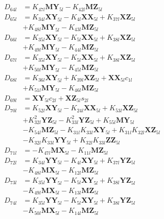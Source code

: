 \begin{align}
 \nonumber \\ 
D_{64l} &= K_{47l}\mathbf{MY}_{5l} - K_{42l}\mathbf{MZ}_{5l} \nonumber \\
D_{65l} &= K_{34l}\mathbf{XY}_{5l} - K_{4l}\mathbf{XX}_{5l} + K_{37l}\mathbf{XZ}_{5l}  \nonumber \\
&+ K_{48l}\mathbf{MY}_{5l} - K_{43l}\mathbf{MZ}_{5l} \nonumber \\
D_{66l} &= K_{35l}\mathbf{XY}_{5l} - K_{5l}\mathbf{XX}_{5l} + K_{38l}\mathbf{XZ}_{5l}  \nonumber \\
&+ K_{49l}\mathbf{MY}_{5l} - K_{44l}\mathbf{MZ}_{5l} \nonumber \\
D_{67l} &= K_{35l}\mathbf{XY}_{5l} - K_{5l}\mathbf{XX}_{5l} + K_{38l}\mathbf{XZ}_{5l}  \nonumber \\
&+ K_{50l}\mathbf{MY}_{5l} - K_{45l}\mathbf{MZ}_{5l} \nonumber \\
D_{68l} &= K_{36l}\mathbf{XY}_{5l} + K_{39l}\mathbf{XZ}_{5l} + \mathbf{XX}_{5l}c_{1l}  \nonumber \\
&+ K_{51l}\mathbf{MY}_{5l} - K_{46l}\mathbf{MZ}_{5l} \nonumber \\
D_{69l} &= \mathbf{XY}_{5l}c_{2l} + \mathbf{XZ}_{5l}s_{2l} \nonumber \\
D_{70l} &= K_{52l}\mathbf{XY}_{5l} - K_{24l}\mathbf{XX}_{5l} + K_{53l}\mathbf{XZ}_{5l}  \nonumber \\
&+ K_{32l}^2\mathbf{YZ}_{5l} - K_{33l}^2\mathbf{YZ}_{5l} + K_{55l}\mathbf{MY}_{5l}  \nonumber \\
&- K_{54l}\mathbf{MZ}_{5l} - K_{31l}K_{33l}\mathbf{XY}_{5l} + K_{31l}K_{32l}\mathbf{XZ}_{5l}  \nonumber \\
&- K_{32l}K_{33l}\mathbf{YY}_{5l} + K_{32l}K_{33l}\mathbf{ZZ}_{5l} \nonumber \\
D_{71l} &= - K_{47l}\mathbf{MX}_{5l} - K_{11l}\mathbf{MZ}_{5l} \nonumber \\
D_{72l} &= K_{34l}\mathbf{YY}_{5l} - K_{4l}\mathbf{XY}_{5l} + K_{37l}\mathbf{YZ}_{5l}  \nonumber \\
&- K_{48l}\mathbf{MX}_{5l} - K_{12l}\mathbf{MZ}_{5l} \nonumber \\
D_{73l} &= K_{35l}\mathbf{YY}_{5l} - K_{5l}\mathbf{XY}_{5l} + K_{38l}\mathbf{YZ}_{5l}  \nonumber \\
&- K_{49l}\mathbf{MX}_{5l} - K_{13l}\mathbf{MZ}_{5l} \nonumber \\
D_{74l} &= K_{35l}\mathbf{YY}_{5l} - K_{5l}\mathbf{XY}_{5l} + K_{38l}\mathbf{YZ}_{5l}  \nonumber \\
&- K_{50l}\mathbf{MX}_{5l} - K_{14l}\mathbf{MZ}_{5l} \nonumber \\

\end{align}
